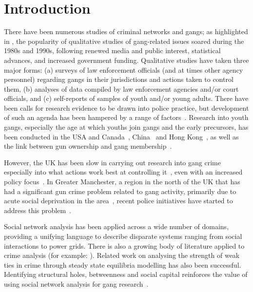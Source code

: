 \documentclass[twocolumn]{svjour3}          %
\theoremstyle{definition}
\begin{document}
\section{Introduction}\label{sec:introduction}

There have been numerous studies of criminal networks and gangs; as
highlighted in \citet{hughes:2005}, the popularity of qualitative
studies of gang-related issues soared during the 1980s and 1990s,
following renewed media and public interest, statistical advances, and
increased government funding. Qualitative studies have taken three
major forms: (a) surveys of law enforcement officials (and at times
other agency personnel) regarding gangs in their jurisdictions and
actions taken to control them, (b) analyses of data compiled by law
enforcement agencies and/or court officials, and (c) self-reports of
samples of youth and/or young adults.  There have been calls for
research evidence to be drawn into police practice, but development of
such an agenda has been hampered by a range of
factors~\citep{bullock+tilley:2009}. Research into youth gangs,
especially the age at which youths join gangs and the early
precursors, has been conducted in the USA and
Canada~\citep{hill-et-al:2001}, China~\citep{webb-et-al:2011} and Hong
Kong~\citep{lo:2011}, as well as the link between gun ownership and
gang membership~\citep{bjerregaard+lizotte:1995,bricknell:2008}.

However, the UK has been slow in carrying out research into gang crime
especially into what actions work best at controlling
it~\citep{pitts:2007,hallsworth+silverstone:2009}, even with an
increased policy
focus~\citep{HalesLewisSilverstone2006,golding+mcclory:2008}. In
Greater Manchester, a region in the north of the UK that has had a
significant gun crime problem related to gang activity, primarily due
to acute social deprivation in the
area~\citep{BBCNews2003,BBCNews2004,HalesLewisSilverstone2006}, recent
police initiatives have started to address this
problem~\citep{BBCNews2010}.

Social network analysis has been applied across a wide number of
domains, providing a unifying language to describe disparate systems
ranging from social interactions to power grids. There is also a
growing body of literature applied to crime analysis (for example:
\citep{BaronTindall1993,Klerks2001,Hansen2005,OatleyZeleznikowLearyEwart2005,OatleyEwartZeleznikow2006,CalvoArmengolZenou2006,HutchinsBenhamHutchins2009}).
Related work \citep{CalvoArmengolVerdierZenou2007,PatacchiniZenou2008} on analysing
the strength of weak ties in crime through steady state equilibria
modelling has also been successful. Identifying structural holes,
betweenness and social capital reinforces the value of using social
network analysis for gang research~\citep{papachristos:2006}.
\end{document}
